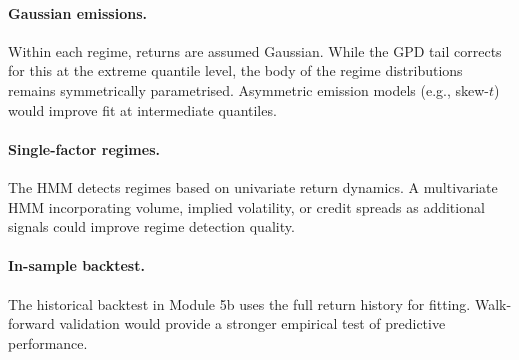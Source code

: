 \documentclass[12pt]{article}
\begin{document}
\paragraph{Gaussian emissions.}  Within each regime, returns are
assumed Gaussian.  While the GPD tail corrects for this at the extreme
quantile level, the body of the regime distributions remains
symmetrically parametrised.  Asymmetric emission models (e.g.,
skew-$t$) would improve fit at intermediate quantiles.

\paragraph{Single-factor regimes.}  The HMM detects regimes based on
univariate return dynamics.  A multivariate HMM incorporating volume,
implied volatility, or credit spreads as additional signals could
improve regime detection quality.

\paragraph{In-sample backtest.}  The historical backtest in Module 5b
uses the full return history for fitting.  Walk-forward validation
would provide a stronger empirical test of predictive performance.
\end{document}
